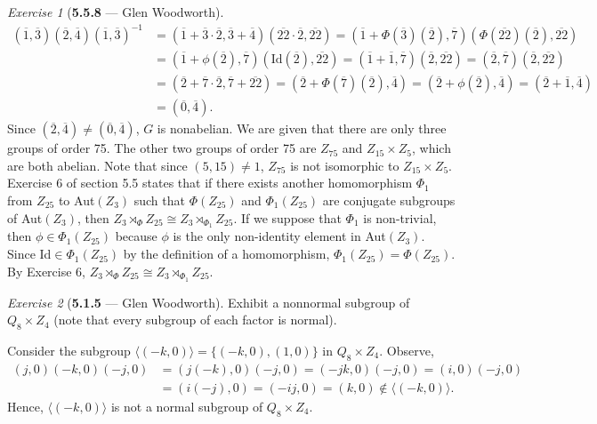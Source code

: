 \documentclass[12pt]{amsart}
\makeatletter
\theoremstyle{remark}
\newtheorem*{exercise}{Exercise}%
\renewenvironment{proof}[1][\proofname]{\par\doublespacing
  \pushQED{\qed}%
  \normalfont \topsep6\p@\@plus6\p@\relax
  \list{}{%
    \settowidth{\leftmargin}{\itshape\proofname:\hskip\labelsep}%
    \setlength{\labelwidth}{0pt}%
    \setlength{\itemindent}{-\leftmargin}%
  }%
  \item[\hskip\labelsep\itshape#1\@addpunct{:}]\ignorespaces
}{%
  \popQED\endlist\@endpefalse
  \singlespacing
}
\theoremstyle{mycomment}
\makeatother
\begin{document}
\begin{exercise}[\textbf{5.5.8} --- Glen Woodworth]
\begin{proof}
\begin{align*}
(\overline{1},\overline{3})(\overline{2},\overline{4})(\overline{1},\overline{3})^{-1}&=(\overline{1}+\overline{3}\cdot\overline{2},\overline{3}+\overline{4})(\overline{22}\cdot\overline{2},\overline{22})=(\overline{1}+\Phi(\overline{3})(\overline{2}),\overline{7})(\Phi(\overline{22})(\overline{2}),\overline{22})\\
&=(\overline{1}+\phi(\overline{2}),\overline{7})(\text{Id}(\overline{2}),\overline{22})=(\overline{1}+\overline{1},\overline{7})(\overline{2},\overline{22})=(\overline{2},\overline{7})(\overline{2},\overline{22})\\
&=(\overline{2}+\overline{7}\cdot\overline{2},\overline{7}+\overline{22})=(\overline{2}+\Phi(\overline{7})(\overline{2}),\overline{4})=(\overline{2}+\phi(\overline{2}),\overline{4})=(\overline{2}+\overline{1},\overline{4})\\
&=(\overline{0},\overline{4}).
\end{align*}
Since $(\overline{2},\overline{4})\ne(\overline{0},\overline{4})$, $G$ is nonabelian. We are given that there are only three groups of order 75. The other two groups of order 75 are $Z_{75}$ and $Z_{15}\times Z_{5}$, which are both abelian. Note that since $(5,15)\ne 1$, $Z_{75}$ is not isomorphic to $Z_{15}\times Z_{5}$. Exercise 6 of section 5.5 states that if there exists another homomorphism $\Phi_1$ from $Z_{25}$ to Aut$(Z_3)$ such that $\Phi(Z_{25})$ and $\Phi_1(Z_{25})$ are conjugate subgroups of Aut$(Z_3)$, then $Z_3\rtimes_{\Phi}Z_{25}\cong Z_3\rtimes_{\Phi_1}Z_{25}.$ If we suppose that $\Phi_1$ is non-trivial, then $\phi\in\Phi_1(Z_{25})$ because $\phi$ is the only non-identity element in Aut$(Z_3)$. Since Id$\in\Phi_1(Z_{25})$ by the definition of a homomorphism, $\Phi_1(Z_{25})=\Phi(Z_{25})$. By Exercise 6, $Z_3\rtimes_{\Phi}Z_{25}\cong Z_3\rtimes_{\Phi_1}Z_{25}.$
  \end{proof}
 
\end{exercise}

\begin{exercise}[\textbf{5.1.5} --- Glen Woodworth] Exhibit a nonnormal subgroup of $Q_8\times Z_4$ (note that every subgroup of each factor is normal).
  \begin{proof} Consider the subgroup $\langle (-k,0)\rangle=\{(-k,0),(1,0)\}$ in $Q_8\times Z_4$. Observe, \begin{align*}
  (j,0)(-k,0)(-j,0)&=(j(-k),0)(-j,0)=(-jk,0)(-j,0)=(i,0)(-j,0)\\
  &=(i(-j),0)=(-ij,0)=(k,0)\notin\langle (-k,0)\rangle.\end{align*}
 Hence, $\langle (-k,0)\rangle$ is not a normal subgroup of $Q_8\times Z_4$.
  \end{proof}
\end{exercise}




  
\end{document}
